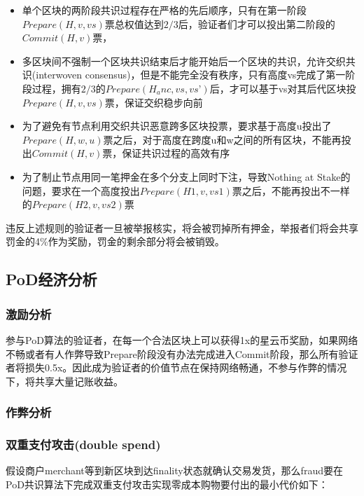 \begin{itemize}
\item 单个区块的两阶段共识过程存在严格的先后顺序，只有在第一阶段$Prepare(H, v, vs)$票总权值达到$2/3$后，验证者们才可以投出第二阶段的$Commit(H, v)$票，
\item 多区块间不强制一个区块共识结束后才能开始后一个区块的共识，允许交织共识(interwoven consensus)，但是不能完全没有秩序，只有高度vs完成了第一阶段过程，拥有$2/3$的$Prepare(H_anc, vs, vs’)$后，才可以基于vs对其后代区块投$Prepare(H, v, vs)$票，保证交织稳步向前
\item 为了避免有节点利用交织共识恶意跨多区块投票，要求基于高度u投出了$Prepare(H, w, u)$票之后，对于高度在跨度u和w之间的所有区块，不能再投出$Commit(H, v)$票，保证共识过程的高效有序
\item 为了制止节点用同一笔押金在多个分支上同时下注，导致Nothing at Stake的问题，要求在一个高度投出$Prepare(H1, v, vs1)$票之后，不能再投出不一样的$Prepare(H2, v, vs2)$票
\end{itemize}

违反上述规则的验证者一旦被举报核实，将会被罚掉所有押金，举报者们将会共享罚金的4\%作为奖励，罚金的剩余部分将会被销毁。

\subsection{PoD经济分析}
\label{PoD:economic}

\subsubsection{激励分析}
\label{PoD:economic:incentive}

参与PoD算法的验证者，在每一个合法区块上可以获得1x的星云币奖励，如果网络不畅或者有人作弊导致Prepare阶段没有办法完成进入Commit阶段，那么所有验证者将损失0.5x。因此成为验证者的价值节点在保持网络畅通，不参与作弊的情况下，将共享大量记账收益。

\subsubsection{作弊分析}
\label{PoD:economic:fraud}

\subsubsection*{双重支付攻击(double spend)}
\label{PoD:economic:fraud:double_spend}

假设商户merchant等到新区块到达finality状态就确认交易发货，那么fraud要在PoD共识算法下完成双重支付攻击实现零成本购物要付出的最小代价如下：

